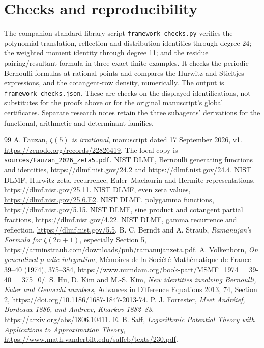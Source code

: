 \documentclass[11pt]{article}
\theoremstyle{definition}
\theoremstyle{remark}\newtheorem*{remark}{Remark}
\begin{document}
\section*{Checks and reproducibility}
The companion standard-library script \texttt{framework\_checks.py} verifies
the polynomial translation, reflection and distribution identities through
degree 24; the weighted moment identity through degree 11; and the residue
pairing/resultant formula in three exact finite examples. It checks the
periodic Bernoulli formulas at rational points and compares the Hurwitz and
Stieltjes expressions, and the cotangent-row density, numerically. The output
is \texttt{framework\_checks.json}. These are checks on the displayed identifications,
not substitutes for the proofs above or for the original manuscript's global
certificates. Separate research notes retain the three subagents' derivations
for the functional, arithmetic and determinant families.

\begin{thebibliography}{99}
 A. Fauzan, \emph{$\zeta(5)$ is irrational}, manuscript dated
17 September 2026, v1. \url{https://zenodo.org/records/22826419}.
The local copy is \texttt{sources/Fauzan\_2026\_zeta5.pdf}.
 NIST DLMF, Bernoulli generating functions and identities,
\url{https://dlmf.nist.gov/24.2} and \url{https://dlmf.nist.gov/24.4}.
 NIST DLMF, Hurwitz zeta, recurrence, Euler--Maclaurin and
Hermite representations, \url{https://dlmf.nist.gov/25.11}.
 NIST DLMF, even zeta values,
\url{https://dlmf.nist.gov/25.6.E2}.
 NIST DLMF, polygamma functions,
\url{https://dlmf.nist.gov/5.15}.
 NIST DLMF, sine product and cotangent partial fractions,
\url{https://dlmf.nist.gov/4.22}.
 NIST DLMF, gamma recurrence and reflection,
\url{https://dlmf.nist.gov/5.5}.
 B. C. Berndt and A. Straub, \emph{Ramanujan's Formula
for $\zeta(2n+1)$}, especially Section 5,
\url{https://arminstraub.com/downloads/pub/ramanujanzeta.pdf}.
 A. Volkenborn, \emph{On generalized $p$-adic integration},
M\'emoires de la Soci\'et\'e Math\'ematique de France 39--40 (1974), 375--384,
\url{https://www.numdam.org/book-part/MSMF_1974__39-40__375_0/}.
 S. Hu, D. Kim and M.-S. Kim, \emph{New identities involving
Bernoulli, Euler and Genocchi numbers}, Advances in Difference Equations 2013,
74, Section 2, \url{https://doi.org/10.1186/1687-1847-2013-74}.
 P. J. Forrester, \emph{Meet Andr\'eief, Bordeaux 1886,
and Andreev, Kharkov 1882--83},
\url{https://arxiv.org/abs/1806.10411}.
 E. B. Saff, \emph{Logarithmic Potential Theory with Applications
to Approximation Theory}, \url{https://www.math.vanderbilt.edu/saffeb/texts/230.pdf}.
\end{thebibliography}
\end{document}
